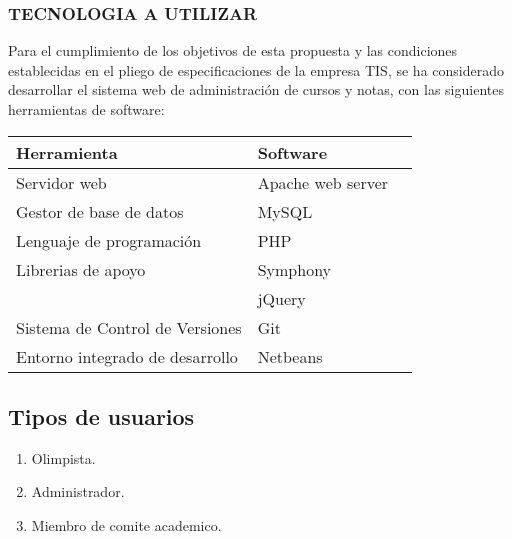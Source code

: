 \subsubsection{TECNOLOGIA A UTILIZAR}
Para el cumplimiento de los objetivos de esta propuesta y las condiciones
establecidas en el pliego de especificaciones de la empresa TIS, se ha
considerado desarrollar el sistema web de administración de cursos y notas,
con las siguientes herramientas de software:

\begin{center}
    \begin{tabular}{|l|l|c|}
    \hline
    \textbf{Herramienta}    & \textbf{Software}  \\
    \hline
    Servidor web                        & Apache web server   \\
    Gestor de base de datos             & MySQL               \\
    Lenguaje de programación            & PHP                 \\
    Librerias de apoyo                  & Symphony            \\
                                        & jQuery              \\
    Sistema de Control de Versiones     & Git                 \\
    Entorno integrado de desarrollo     & Netbeans            \\
    \hline
    \end{tabular}
\end{center}

\subsection{Tipos de usuarios}
\begin{enumerate}
    \item Olimpista.
    \item Administrador.
    \item Miembro de comite academico.
\end{enumerate}


